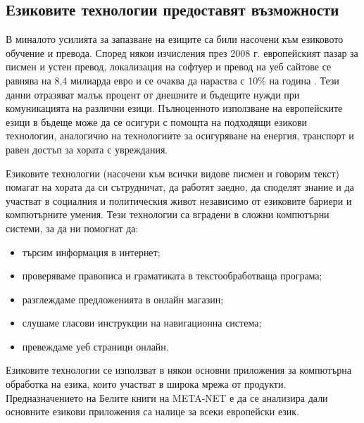 \begin{multicols}{2}

  \subsection{Езиковите технологии предоставят възможности}

  В миналото усилията за запазване на езиците са били насочени
   към езиковото обучение и превода. Според някои
   изчисления през 2008 г. европейският пазар за писмен и
   устен превод, локализация на софтуер и превод на
   уеб сайтове се равнява на 8,4 милиарда евро и се
   очаква да нараства с 10\% на година \cite{EC3}. Тези данни отразяват малък процент от днешните и бъдещите нужди при комуникацията на различни езици.
  Пълноценното използване на европейските езици в бъдеще може да се осигури с помощта на подходящи езикови технологии, аналогично на технологиите за осигуряване  на енергия, транспорт и равен достъп за хората с увреждания.  

  Езиковите технологии (насочени към всички видове писмен и говорим текст) помагат на хората да си сътрудничат, да работят заедно, да споделят знание и да участват в социалния и
   политическия живот независимо от езиковите бариери и компютърните умения. Тези технологии са вградени в сложни компютърни системи, за да ни помогнат да:
  \columnbreak

  \begin{itemize}
  \item търсим информация в интернет;
  \item проверяваме правописа и граматиката в текстообработваща програма;
  \item разглеждаме предложенията в онлайн магазин;
  \item слушаме гласови инструкции на навигационна система;
  \item превеждаме уеб страници онлайн.
  \end{itemize}

  Езиковите технологии се използват в някои основни приложения за компютърна обработка на езика, които участват в широка мрежа от продукти. Предназначението на Белите книги на META-NET е да се анализира дали основните езикови приложения са налице за всеки европейски език.



\end{multicols}
